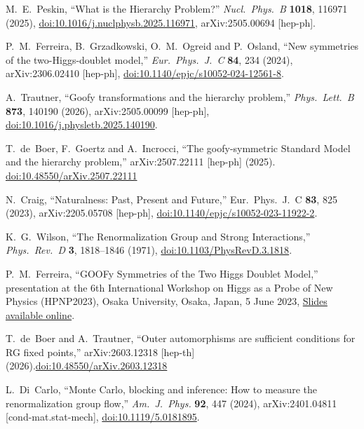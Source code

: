 M.~E.~Peskin,
``What is the Hierarchy Problem?''
\textit{Nucl.\ Phys.\ B} \textbf{1018}, 116971 (2025),
\href{https://doi.org/10.1016/j.nuclphysb.2025.116971}{doi:10.1016/j.nuclphysb.2025.116971},
arXiv:2505.00694 [hep-ph].

P.~M.~Ferreira, B.~Grzadkowski, O.~M.~Ogreid and P.~Osland,
``New symmetries of the two-Higgs-doublet model,''
\textit{Eur.\ Phys.\ J.\ C} \textbf{84}, 234 (2024),
arXiv:2306.02410 [hep-ph],
\href{https://doi.org/10.1140/epjc/s10052-024-12561-8}{doi:10.1140/epjc/s10052-024-12561-8}.

A.~Trautner,
``Goofy transformations and the hierarchy problem,''
\textit{Phys.\ Lett.\ B} \textbf{873}, 140190 (2026),
arXiv:2505.00099 [hep-ph],
\href{https://doi.org/10.1016/j.physletb.2025.140190}{doi:10.1016/j.physletb.2025.140190}.

T.~de~Boer, F.~Goertz and A.~Incrocci,
``The goofy-symmetric Standard Model and the hierarchy problem,''
arXiv:2507.22111 [hep-ph] (2025).
\href{https://doi.org/10.48550/arXiv.2507.22111}{doi:10.48550/arXiv.2507.22111}

N.~Craig,
``Naturalness: Past, Present and Future,''
Eur.\ Phys.\ J.\ C \textbf{83}, 825 (2023),
arXiv:2205.05708 [hep-ph],
\href{https://doi.org/10.1140/epjc/s10052-023-11922-2}{doi:10.1140/epjc/s10052-023-11922-2}.

K.~G.~Wilson,
``The Renormalization Group and Strong Interactions,''
\textit{Phys.\ Rev.\ D} \textbf{3}, 1818--1846 (1971),
\href{https://doi.org/10.1103/PhysRevD.3.1818}{doi:10.1103/PhysRevD.3.1818}.

P.~M.~Ferreira,
``GOOFy Symmetries of the Two Higgs Doublet Model,''
presentation at the 6th International Workshop on Higgs as a Probe of New Physics (HPNP2023),
Osaka University, Osaka, Japan, 5 June 2023,
\href{https://indico.global/event/10177/contributions/98130/attachments/44881/84707/New%202HDM%20Symmetries%20-%20HPNP%202023.pdf}
{Slides available online}.

T.~de~Boer and A.~Trautner,
``Outer automorphisms are sufficient conditions for RG fixed points,''
arXiv:2603.12318 [hep-th] (2026).\href{
https://doi.org/10.48550/arXiv.2603.12318}{doi:10.48550/arXiv.2603.12318}
 
L.~Di~Carlo,
``Monte Carlo, blocking and inference: How to measure the
renormalization group flow,''
\textit{Am.\ J.\ Phys.} \textbf{92}, 447 (2024),
arXiv:2401.04811 [cond-mat.stat-mech],
\href{https://doi.org/10.1119/5.0181895}{doi:10.1119/5.0181895}.


